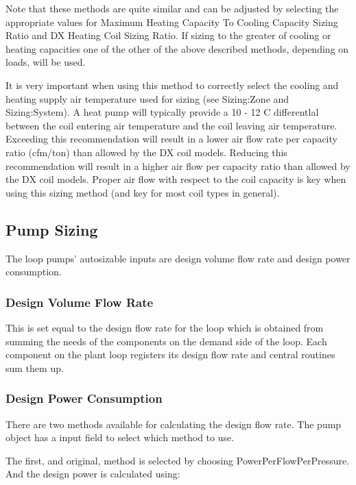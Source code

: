 Note that these methods are quite similar and can be adjusted by selecting the appropriate values for Maximum Heating Capacity To Cooling Capacity Sizing Ratio and DX Heating Coil Sizing Ratio. If sizing to the greater of cooling or heating capacities one of the other of the above described methods, depending on loads, will be used.

It is very important when using this method to correctly select the cooling and heating supply air temperature used for sizing (see Sizing:Zone and Sizing:System). A heat pump will typically provide a 10 - 12 C differentlal between the coil entering air temperature and the coil leaving air temperature. Exceeding this recommendation will result in a lower air flow rate per capacity ratio (cfm/ton) than allowed by the DX coil models. Reducing this recommendation will result in a higher air flow per capacity ratio than allowed by the DX coil models. Proper air flow with respect to the coil capacity is key when using this sizing method (and key for most coil types in general).

\subsection{Pump Sizing}\label{pump-sizing}

The loop pumps' autosizable inputs are design volume flow rate and design power consumption.

\subsubsection{Design Volume Flow Rate}\label{design-volume-flow-rate}

This is set equal to the design flow rate for the loop which is obtained from summing the needs of the components on the demand side of the loop. Each component on the plant loop registers its design flow rate and central routines sum them up.

\subsubsection{Design Power Consumption}\label{design-power-consumption}

There are two methods available for calculating the design flow rate. The pump object has a input field to select which method to use.

The first, and original, method is selected by choosing PowerPerFlowPerPressure. And the design power is calculated using:

